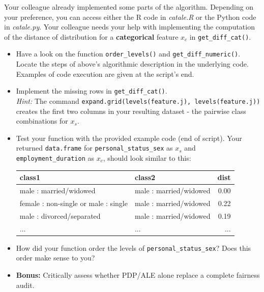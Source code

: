 {\begin{enumerate}[a)]
Your colleague already implemented some parts of the algorithm. Depending on your 
preference, you can access either the R code in \textit{catale.R} or the 
Python code in \textit{catale.py}.
Your colleague needs your help with implementing the computation of the distance of 
distribution for a \textbf{categorical} feature $x_c$ in 
\texttt{get\_diff\_cat()}. 

\begin{itemize}
  \item Have a look on the function \texttt{order\_levels()} and \texttt{get\_diff\_numeric()}. 
  Locate the steps of above's  algorithmic description in the underlying code.
  Examples of code execution are given at the script's end. 
  \item Implement the missing rows in \texttt{get\_diff\_cat()}.\\
  \textit{Hint:} The command \texttt{expand.grid(levels(feature.j), levels(feature.j))} creates the first two columns in 
your resulting dataset - the pairwise class combinations for $x_s$.
  \item Test your function with the provided example code (end of script). 
  Your returned \texttt{data.frame} for \texttt{personal\_status\_sex} as $x_s$ 
  and \texttt{employment\_duration} as $x_c$, should look 
  similar to this: 

\begin{table}[ht]
\centering
\begin{tabular}{llr}
  \hline
 class1 & class2 & dist \\ 
  \hline
male : married/widowed & male : married/widowed & 0.00 \\ 
female : non-single or male : single & male : married/widowed & 0.22 \\ 
male : divorced/separated & male : married/widowed & 0.19 \\ 
  ... & ... & ... \\
   \hline
\end{tabular}
\end{table}

\item How did your function order the levels of \texttt{personal\_status\_sex}? 
Does this order make sense to you? 

\item \textbf{Bonus:} Critically assess whether PDP/ALE alone replace a complete fairness audit.

\end{itemize}
\end{enumerate}
}